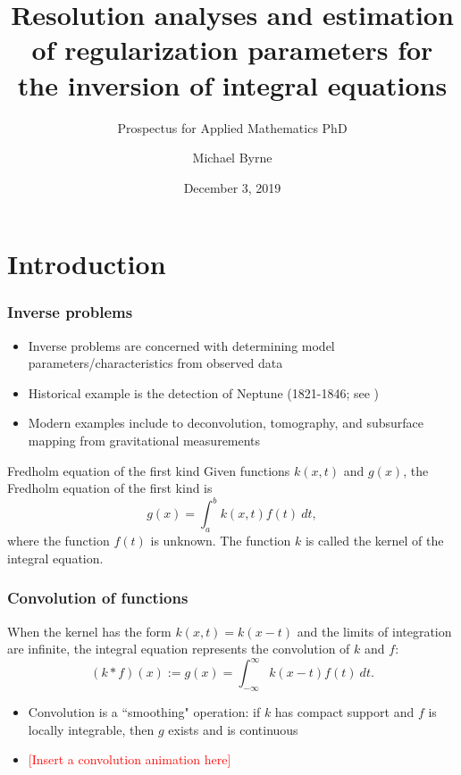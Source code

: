 \documentclass{beamer}
\author{Michael Byrne}
\title{Resolution analyses and estimation of regularization parameters for the inversion of integral equations}
\subtitle{Prospectus for Applied Mathematics PhD}
\institute{Arizona State University}
\date{December 3, 2019}
\newcommand{\ToDo}[1]{\textcolor{red}{[#1]}}
\begin{document}
\begin{frame}
\titlepage
\end{frame}

\begin{frame}
\tableofcontents
\end{frame}

\section{Introduction}

\begin{frame}
\frametitle{Inverse problems}
\begin{itemize}
\item Inverse problems are concerned with determining model parameters/characteristics from observed data
\item Historical example is the detection of Neptune (1821-1846; see \cite{Airy1847})
\item Modern examples include to deconvolution, tomography, and subsurface mapping from gravitational measurements
\end{itemize}
\begin{block}{Fredholm equation of the first kind}
Given functions $k(x,t)$ and $g(x)$, the Fredholm equation of the first kind is
\[g(x) = \int_a^b k(x,t)f(t)~dt,\]
where the function $f(t)$ is unknown. The function $k$ is called the kernel of the integral equation.
\end{block}
\end{frame}

\begin{frame}
\frametitle{Convolution of functions}
When the kernel has the form $k(x,t) = k(x-t)$ and the limits of integration are infinite, the integral equation represents the convolution of $k$ and $f$:
\[(k * f)(x) := g(x) = \int_{-\infty}^{\infty} k(x-t)f(t)~dt.\]
\begin{itemize}
\item Convolution is a ``smoothing" operation: if $k$ has compact support and $f$ is locally integrable, then $g$ exists and is continuous \cite{DebnathLokenath1999ItHs}
\item \ToDo{Insert a convolution animation here}
\end{itemize}
\end{frame}
\end{document}
